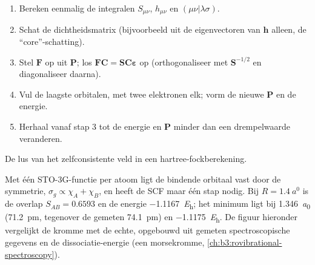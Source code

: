 \begin{method}\label{met:b3:computational-chemistry:scf}
\begin{enumerate}
  \item Bereken eenmalig de integralen $S_{\mu\nu}$, $h_{\mu\nu}$ en $(\mu\nu|\lambda\sigma)$.
  \item Schat de dichtheidsmatrix (bijvoorbeeld uit de eigenvectoren van
        $\mathbf h$ alleen, de ``core''-schatting).
  \item Stel $\mathbf F$ op uit $\mathbf P$; los $\mathbf F\mathbf C = \mathbf S\mathbf C
        \boldsymbol\varepsilon$ op (orthogonaliseer met $\mathbf S^{-1/2}$ en
        diagonaliseer daarna).
  \item Vul de laagste orbitalen, met twee elektronen elk; vorm de nieuwe
        $\mathbf P$ en de energie.
  \item Herhaal vanaf stap 3 tot de energie en $\mathbf P$ minder dan een
        drempelwaarde veranderen.
\end{enumerate}
\end{method}

\begin{omfigure}

{\small De lus van het zelfconsistente veld in een hartree-fockberekening.}
\end{omfigure}

\begin{example}\label{ex:b3:computational-chemistry:h2}
Met één STO-3G-functie per atoom ligt de bindende orbitaal vast door de
symmetrie,
$\sigma_g \propto \chi_A + \chi_B$, en heeft de SCF maar één stap nodig. Bij $R =
\qty{1.4}{\bohr}$ is de overlap $S_{AB} = 0.6593$ en de energie
\qty{-1.1167}{\hartree}; het minimum ligt bij \qty{1.346}{\bohr} (\qty{71.2}{pm},
tegenover de gemeten \qty{74.1}{pm}) en \qty{-1.1175}{\hartree}. De figuur
hieronder vergelijkt de kromme met de echte, opgebouwd uit gemeten
spectroscopische gegevens en de dissociatie-energie (een morsekromme,
\cref{ch:b3:rovibrational-spectroscopy}).
\end{example}


